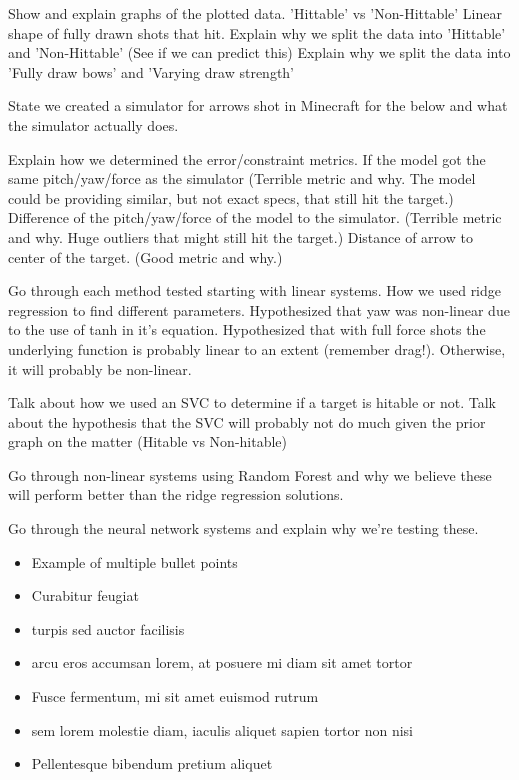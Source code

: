 \documentclass[twoside,twocolumn]{article}
\begin{document}
Show and explain graphs of the plotted data.
'Hittable' vs 'Non-Hittable'
Linear shape of fully drawn shots that hit.
Explain why we split the data into 'Hittable' and 'Non-Hittable' (See if we can predict this)
Explain why we split the data into 'Fully draw bows' and 'Varying draw strength'

State we created a simulator for arrows shot in Minecraft for the below and what the simulator actually does.

Explain how we determined the error/constraint metrics.
If the model got the same pitch/yaw/force as the simulator (Terrible metric and why. The model could be providing similar, but not exact specs, that still hit the target.)
Difference of the pitch/yaw/force of the model to the simulator. (Terrible metric and why. Huge outliers that might still hit the target.)
Distance of arrow to center of the target. (Good metric and why.)

Go through each method tested starting with linear systems.
How we used ridge regression to find different parameters.
Hypothesized that yaw was non-linear due to the use of tanh in it's equation.
Hypothesized that with full force shots the underlying function is probably linear to an extent (remember drag!). Otherwise, it will probably be non-linear.

Talk about how we used an SVC to determine if a target is hitable or not.
Talk about the hypothesis that the SVC will probably not do much given the prior graph on the matter (Hitable vs Non-hitable)

Go through non-linear systems using Random Forest and why we believe these will perform better than the ridge regression solutions.

Go through the neural network systems and explain why we're testing these.

\begin{itemize}
\item Example of multiple bullet points
\item Curabitur feugiat
\item turpis sed auctor facilisis
\item arcu eros accumsan lorem, at posuere mi diam sit amet tortor
\item Fusce fermentum, mi sit amet euismod rutrum
\item sem lorem molestie diam, iaculis aliquet sapien tortor non nisi
\item Pellentesque bibendum pretium aliquet
\end{itemize}
\blindtext %
\end{document}
